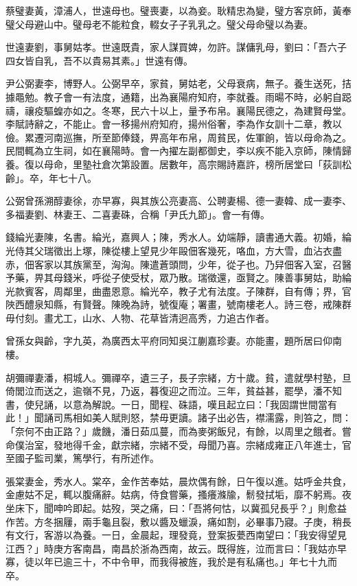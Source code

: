 \begin{pinyinscope}
蔡璧妻黃，漳浦人，世遠母也。璧喪妻，以為妾。耿精忠為變，璧方客京師，黃奉璧父母避山中。璧母老不能粒食，輟女子子乳乳之。璧父母命璧以為妻。

世遠妻劉，事舅姑孝。世遠既貴，家人謀買婢，勿許。謀傭乳母，劉曰：「吾六子四女皆自乳，吾不以貴易其素。」世遠有傳。

尹公弼妻李，博野人。公弼早卒，家貧，舅姑老，父母衰病，無子。養生送死，拮據黽勉。教子會一有法度，通籍，出為襄陽府知府，李就養。雨暘不時，必躬自跽禱，禳疫驅蝗亦如之。冬寒，民六十以上，量予布帛。襄陽民德之，為建賢母堂。李賦詩辭之，不能止。會一移揚州府知府，揚州俗奢，李為作女訓十二章，教以儉。累遷河南巡撫，所至節俸錢，畀高年布帛，周貧民，佐軍餉，皆以母命為之。民間輒為立生祠，如在襄陽時。會一內擢左副都御史，李以疾不能入京師，陳情歸養。復以母命，里塾社倉次第設置。居數年，高宗賜詩嘉許，榜所居堂曰「荻訓松齡」。卒，年七十八。

公弼曾孫溯醇妻徐，亦早寡，與其族公亮妻高、公聘妻楊、德一妻韓、成一妻李、多福妻劉、林妻王、二喜妻硃，合稱「尹氏九節」。會一有傳。

錢綸光妻陳，名書。綸光，嘉興人；陳，秀水人。幼端靜，讀書通大義。初婚，綸光侍其父瑞徵出上塚，陳從樓上望見少年毆佃客幾死，咯血，方大雪，血沾衣盡赤，佃客家以其族黨至，洶洶。陳遣蒼頭問，少年，從子也。乃舁佃客入室，召醫予藥，畀其母錢米，呼從子使受杖，眾乃散。瑞徵還，亟賢之。陳善事舅姑，助綸光款賓客，周鄰里，曲盡恩意。綸光卒，教子尤有法度。子陳群，自有傳；界，官陜西醴泉知縣，有賢聲。陳晚為詩，號復庵；署畫，號南樓老人。詩三卷，戒陳群毋付刻。畫尤工，山水、人物、花草皆清迥高秀，力追古作者。

曾孫女與齡，字九英，為廣西太平府同知吳江蒯嘉珍妻。亦能畫，題所居曰仰南樓。

胡彌禪妻潘，桐城人。彌禪卒，遺三子，長子宗緒，方十歲。貧，遣就學村塾，旦倚閭泣而送之，逾嶺不見，乃返，暮復迎之而泣。三年，貧益甚，罷學，潘不知書，使兒誦，以意為解說。一日，聞程、硃語，嘆且起立曰：「我固謂世間當有此！」聞誦司馬相如美人賦則怒，禁毋更讀。諸子出必告，襟濡露，則笞之，問：「奈何不由正路？」歲饑，潘日茹瓜蔓，而為麥粥飯兒，有餘，以周里之餓者。嘗命僕治室，發地得千金，獻宗緒，宗緒不受，母聞乃喜。宗緒成雍正八年進士，官至國子監司業，篤學行，有所述作。

張棠妻金，秀水人。棠卒，金作苦奉姑，晨炊偶有餘，日午復以進。姑呼金共食，金慮姑不足，輒以腹痛辭。姑病，侍食嘗藥，搔癢滌牏，鬋發拭垢，靡不躬焉。夜坐床下，聞呻吟即起。姑歿，哭之痛，曰：「吾將何怙，以冀孤兒長乎？」則愈益作苦。方冬捆屨，兩手龜且裂，敷以醬及蠟淚，痛如割，必畢事乃寢。子庚，稍長有文行，客游以為養。一日，金晨起，理發竟，登案扳甍西南望曰：「我安得望見江西？」時庚方客南昌，南昌於浙為西南，故云。既得旌，泣而言曰：「我姑亦早寡，徒以年已逾三十，不中令甲，而我得被旌，我於是有私痛也。」年七十九而卒。


\end{pinyinscope}
